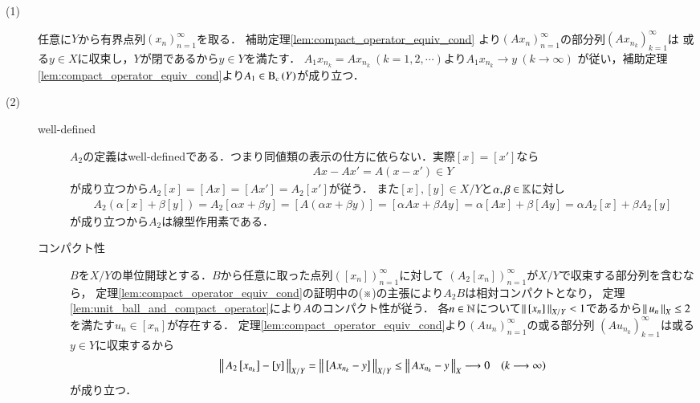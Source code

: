 	\begin{prf}\mbox{}
		\begin{description}
			\item[(1)] 任意に$Y$から有界点列$(x_n)_{n=1}^{\infty}$を取る．
				補助定理\ref{lem:compact_operator_equiv_cond}
				より$(A x_n)_{n=1}^{\infty}$の部分列$\left( A x_{n_k} \right)_{k=1}^{\infty}$は
				或る$y \in X$に収束し，$Y$が閉であるから$y \in Y$を満たす．
				$A_1 x_{n_k} = A x_{n_k}\ (k=1,2,\cdots)$より$A_1 x_{n_k} \longrightarrow y\ (k \longrightarrow \infty)$
				が従い，補助定理\ref{lem:compact_operator_equiv_cond}より$A_1 \in \mathrm{B}_c\left(Y\right) $が成り立つ．
				
			\item[(2)]
				\begin{description}
					\item[well-defined] $A_2$の定義はwell-definedである．つまり同値類の表示の仕方に依らない．実際$[x] = [x']$なら
						\begin{align}
							A x - A x' = A(x - x') \in Y
						\end{align}
						が成り立つから$A_2[x] = [Ax] = [Ax'] = A_2[x']$が従う．
						また$[x],[y] \in X/Y$と$\alpha,\beta \in \mathbb{K}$に対し
						\begin{align}
							A_2(\alpha[x] + \beta[y]) = A_2[\alpha x + \beta y] 
							= [A(\alpha x + \beta y)] = [\alpha A x + \beta A y] = \alpha [Ax] + \beta [Ay] = \alpha A_2[x] + \beta A_2[y]
						\end{align}
						が成り立つから$A_2$は線型作用素である．
						
					\item[コンパクト性]
						$B$を$X/Y$の単位開球とする．$B$から任意に取った点列$\left( [x_n] \right)_{n=1}^{\infty}$に対して
						$\left( A_2[x_n] \right)_{n=1}^{\infty}$が$X/Y$で収束する部分列を含むなら，
						定理\ref{lem:compact_operator_equiv_cond}の証明中の(※)の主張により$A_2 B$は相対コンパクトとなり，
						定理\ref{lem:unit_ball_and_compact_operator}により$A$のコンパクト性が従う．
						各$n \in \mathbb{N}$について$\left\|\, [x_n]\, \right\|_{X/Y} < 1$であるから$\left\|\, u_n\, \right\|_{X} \leq 2$を満たす$u_n \in [x_n]$が存在する．
						定理\ref{lem:compact_operator_equiv_cond}より$(A u_n)_{n=1}^{\infty}$の或る部分列
						$\left( A u_{n_k} \right)_{k=1}^{\infty}$は或る$y \in Y$に収束するから
						\begin{align}
							\left\|\, A_2 \left[x_{n_k}\right] - [y]\, \right\|_{X/Y} = \left\|\, \left[ A x_{n_k} - y \right]\, \right\|_{X/Y} 
							\leq \left\|\, A x_{n_k} - y\, \right\|_{X} \longrightarrow 0 \quad (k \longrightarrow \infty)
						\end{align}
						が成り立つ．
						\QED
				\end{description}
		\end{description}
	\end{prf}
	
	\begin{screen}
		\begin{thm}
			
		\end{thm}
	\end{screen}